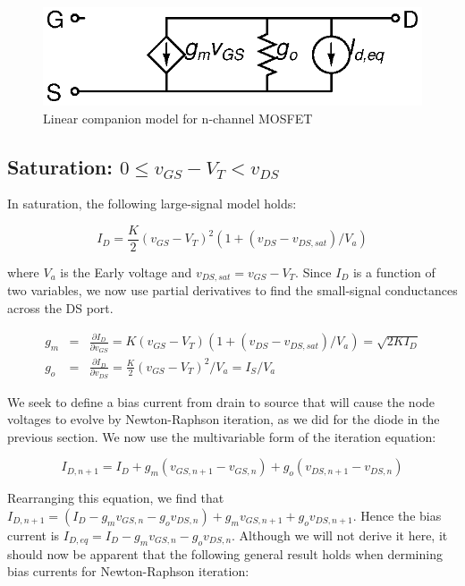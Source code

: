 \documentclass{article}
\begin{document}
\begin{figure}[h]
\begin{center}
\includegraphics{fig/nmos.eps}
\caption{Linear companion model for n-channel MOSFET \label{fig:nmos}}
\end{center}
\end{figure}

\subsection{Saturation: $ 0 \leq v_{GS} - V_T < v_{DS} $}

In saturation, the following large-signal model holds:

\begin{equation}
I_D=\frac{K}{2}(v_{GS}-V_T)^2 (1+(v_{DS}-v_{DS,sat})/V_a)
\end{equation}

where $V_a$ is the Early voltage and  $v_{DS,sat}=v_{GS}-V_T$.  Since $I_D$ is a function of two variables, we now use partial derivatives to find the small-signal conductances across the DS port.

\begin{eqnarray}
g_m&=&\frac{\partial I_D}{\partial v_{GS}}=K(v_{GS}-V_T)(1+(v_{DS}-v_{DS,sat})/V_a)=\sqrt{2KI_D} \\
g_o&=&\frac{\partial I_D}{\partial v_{DS}}=\frac{K}{2}(v_{GS}-V_T)^2 / V_a=I_S/V_a
\end{eqnarray}

We seek to define a bias current from drain to source that will cause the node voltages to evolve by Newton-Raphson iteration, as we did for the diode in the previous section.  We now use the multivariable form of the iteration equation:

\begin{equation}
I_{D,n+1}=I_D+g_m(v_{GS,n+1}-v_{GS,n})+g_o(v_{DS,n+1}-v_{DS,n})
\end{equation}

Rearranging this equation, we find that $I_{D,n+1}=(I_D-g_mv_{GS,n}-g_ov_{DS,n})+g_mv_{GS,n+1}+g_ov_{DS,n+1}$.  Hence the bias current is $I_{D,eq}=I_D-g_mv_{GS,n}-g_ov_{DS,n}$.  Although we will not derive it here, it should now be apparent that the following general result holds when dermining bias currents for Newton-Raphson iteration:
\end{document}
